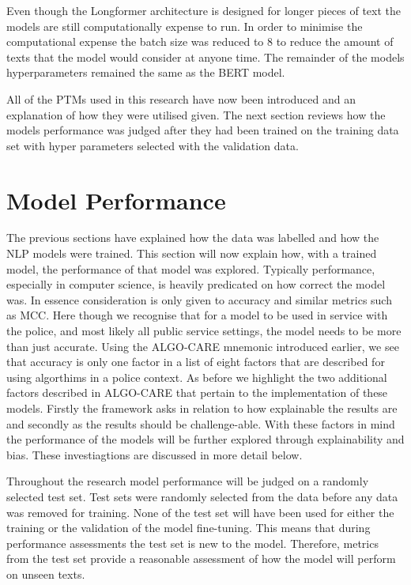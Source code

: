 Even though the Longformer architecture is designed for longer pieces of text the models are still computationally expense to run. In order to minimise the computational expense the batch size was reduced to 8 to reduce the amount of texts that the model would consider at anyone time. The remainder of the models hyperparameters remained the same as the BERT model.

All of the PTMs used in this research have now been introduced and an explanation of how they were utilised given. The next section reviews how the models performance was judged after they had been trained on the training data set with hyper parameters selected with the validation data.


\section{Model Performance} The previous sections have explained how the data was labelled and how the NLP models were trained. This section will now explain how, with a trained model, the performance of that model was explored. Typically performance, especially in computer science, is heavily predicated on how correct the model was. In essence consideration is only given to accuracy and similar metrics such as MCC. Here though we recognise that for a model to be used in service with the police, and most likely all public service settings, the model needs to be more than just accurate. Using the ALGO-CARE mnemonic introduced earlier, we see that accuracy is only one factor in a list of eight factors that are described for using algorthims in a police context. As before we highlight  the two additional factors described in ALGO-CARE that pertain to the implementation of these models. Firstly the framework asks  in relation to how explainable the results are and secondly   as the results should be challenge-able. With these factors in mind the performance of the models will be further explored through explainability and bias. These investiagtions are discussed in more detail below. 

Throughout the research model performance will be judged on a randomly selected test set. Test sets were randomly selected from the data before any data was removed for training. None of the test set will have been used for either the training or the validation of the model fine-tuning. This means that during performance assessments the test set is new to the model. Therefore, metrics from the test set  provide a reasonable assessment of how the model will perform on unseen texts. 

